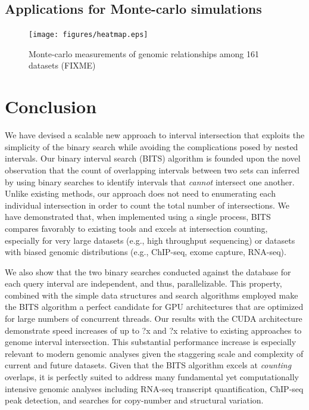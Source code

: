 \documentclass{bioinfo}
\begin{document}
        

        \subsection{Applications for Monte-carlo simulations}
        
        \begin{figure}[t]
                \texttt{[image: figures/heatmap.eps]}
                \caption[]{Monte-carlo measurements of genomic relationships among 161 datasets (FIXME)}
        \end{figure}
        

        \section{Conclusion}
        
        We have devised a scalable new approach to interval intersection
        that exploits the simplicity of the binary search while avoiding the complications
        posed by nested intervals. Our binary interval search (BITS) algorithm is founded upon the novel 
        observation that the count of overlapping intervals between two sets 
        can inferred by using binary searches to identify intervals that \emph{cannot}
        intersect one another. Unlike existing methods, our approach does not need
        to enumerating each individual intersection in order to count the total number 
        of intersections. We have demonstrated that, when implemented using a single process,
        BITS compares favorably to existing tools and excels at intersection counting, especially
        for very large datasets (e.g., high throughput sequencing) or datasets with biased
        genomic distributions (e.g., ChIP-seq, exome capture, RNA-seq).
        
        We also show that the two binary searches conducted
        against the database for each query interval are independent, and thus, parallelizable.
        This property, combined with the simple data structures and search algorithms employed
        make the BITS algorithm a perfect candidate for GPU architectures that are optimized for
        large numbers of concurrent threads. Our results with the CUDA architecture
        demonstrate speed increases of up to ?x and ?x relative to existing 
        approaches to genome interval intersection. This substantial performance increase 
        is especially relevant to modern genomic analyses given the staggering scale and complexity 
        of current and future datasets.  Given that the BITS algorithm excels at \emph{counting}
        overlaps, it is perfectly suited to address many fundamental yet computationally
        intensive genomic analyses including RNA-seq transcript quantification, ChIP-seq
        peak detection, and searches for copy-number and structural variation.
        
\end{document}
